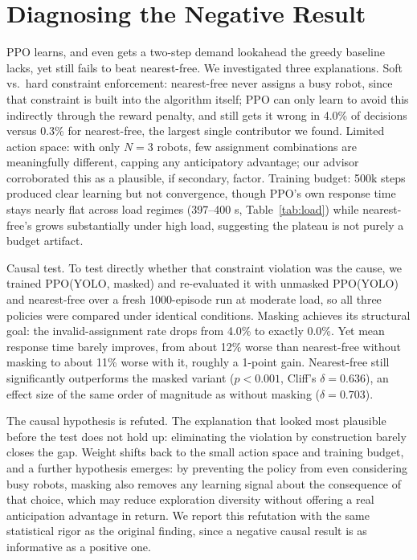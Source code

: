 \documentclass[conference]{IEEEtran}
\begin{document}
\section{Diagnosing the Negative Result}

PPO learns, and even gets a two-step demand lookahead the greedy baseline lacks, yet still fails to beat nearest-free. We investigated three explanations. Soft vs.\ hard constraint enforcement: nearest-free never assigns a busy robot, since that constraint is built into the algorithm itself; PPO can only learn to avoid this indirectly through the reward penalty, and still gets it wrong in 4.0\% of decisions versus 0.3\% for nearest-free, the largest single contributor we found. Limited action space: with only $N=3$ robots, few assignment combinations are meaningfully different, capping any anticipatory advantage; our advisor corroborated this as a plausible, if secondary, factor. Training budget: 500k steps produced clear learning but not convergence, though PPO's own response time stays nearly flat across load regimes (397--400 s, Table~\ref{tab:load}) while nearest-free's grows substantially under high load, suggesting the plateau is not purely a budget artifact.

Causal test. To test directly whether that constraint violation was the cause, we trained PPO(YOLO, masked) and re-evaluated it with unmasked PPO(YOLO) and nearest-free over a fresh 1000-episode run at moderate load, so all three policies were compared under identical conditions. Masking achieves its structural goal: the invalid-assignment rate drops from 4.0\% to exactly 0.0\%. Yet mean response time barely improves, from about 12\% worse than nearest-free without masking to about 11\% worse with it, roughly a 1-point gain. Nearest-free still significantly outperforms the masked variant ($p<0.001$, Cliff's $\delta=0.636$), an effect size of the same order of magnitude as without masking ($\delta=0.703$).

The causal hypothesis is refuted. The explanation that looked most plausible before the test does not hold up: eliminating the violation by construction barely closes the gap. Weight shifts back to the small action space and training budget, and a further hypothesis emerges: by preventing the policy from even considering busy robots, masking also removes any learning signal about the consequence of that choice, which may reduce exploration diversity without offering a real anticipation advantage in return. We report this refutation with the same statistical rigor as the original finding, since a negative causal result is as informative as a positive one.
\end{document}
